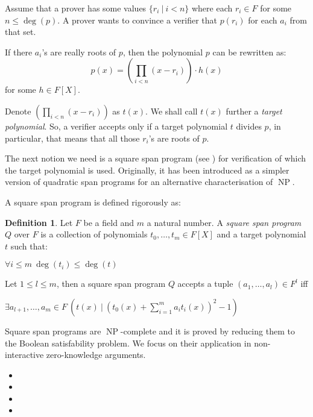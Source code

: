 \documentclass{article}
\theoremstyle{definition}
\newtheorem{definition}{Definition}[section]
\theoremstyle{remark}
\begin{document}
Assume that a prover has some values $\{ r_i \: | \: i < n\}$ where each $r_i \in F$ for some $n \leq \deg(p)$.
A prover wants to convince a verifier that $p(r_i)$ for each $a_i$ from that set.

If there $a_i$'s are really roots of $p$, then the polynomial $p$ can be rewritten as:
\begin{equation}
p(x) = (\prod_{i < n} (x - r_i)) \cdot h(x)
\end{equation}
for some $h \in F[X]$.

Denote $(\prod_{i < n} (x - r_i))$ as $t(x)$. We shall call $t(x)$ further a \emph{target polynomial}. So, a verifier accepts only if a target polynomial $t$ divides $p$, in particular, that means that all those $r_i$'s are roots of $p$.

The next notion we need is a square span program (see \cite{danezis2014square}) for verification of which the target polynomial is used. Originally, it has been introduced as a simpler version of quadratic span programs for an alternative characterisation of $\operatorname{NP}$.

A square span program is defined rigorously as:
\begin{definition}
Let $F$ be a field and $m$ a natural number. A \emph{square span program} $Q$ over $F$ is a collection of polynomials $t_0, \dots, t_m \in F[X]$ and a target polynomial $t$ such that:
\begin{center}
$\forall i \leq m \: \deg(t_i) \leq \deg(t)$
\end{center}

Let $1 \leq l \leq m$, then a square span program $Q$ accepts a tuple $(a_1, \dots, a_l) \in F^l$ iff

\begin{center}
$\exists a_{l + 1}, \dots, a_m \in F \: \left( t(x) \: | \: \left( t_0(x) + \sum \limits_{i = 1}^m a_i t_i(x) \right)^2 - 1 \right)$
\end{center}
\end{definition}

Square span programs are $\operatorname{NP}$-complete and it is proved by reducing them to the Boolean satisfability problem. We focus on their application in non-interactive zero-knowledge arguments.

\begin{itemize}
\item
\item
\item
\item
\end{itemize}
\end{document}
